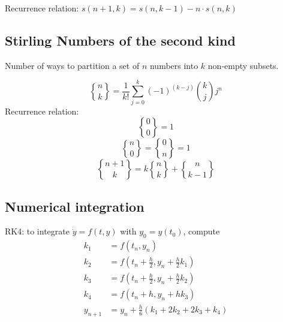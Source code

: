 Recurrence relation:
$s(n + 1, k) = s(n, k - 1) - n \cdot s(n, k)$

\vspace{-\baselineskip}
\subsection{Stirling Numbers of the second kind}
Number of ways to partition a set of $n$ numbers into $k$ non-empty subsets.
\vspace{-\baselineskip}

$${n \brace k}=\frac{1}{k!}\sum_{j=0}^{k}(-1)^{(k-j)}{k \choose j}j^n$$
Recurrence relation:
\vspace{-\baselineskip}
  $${0 \brace 0}=1$$
  $${n \brace 0}={0 \brace n}=1$$
  $${n+1 \brace k}=k{n \brace k}+{n \brace k-1}$$
\vspace{-\baselineskip}
\subsection{Numerical integration}
RK4: to integrate $\dot{y} = f(t, y)$ with $y_0 = y(t_0)$, compute
\begin{align*}
  k_1 &= f(t_n, y_n) \\
  k_2 &= f(t_n + \frac h 2, y_n + \frac h 2 k_1) \\
  k_3 &= f(t_n + \frac h 2, y_n + \frac h 2 k_2) \\
  k_4 &= f(t_n + h, y_n + h k_3) \\
  y_{n+1} &= y_n + \frac h 6 (k_1 + 2k_2 + 2k_3 + k_4) 
\end{align*}
